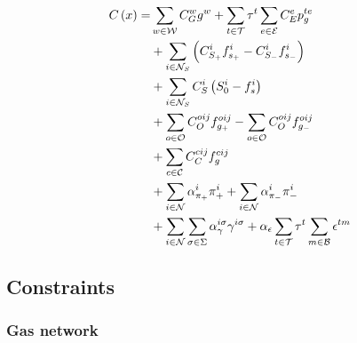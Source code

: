 
\begin{equation}
\begin{aligned}
C \left( x \right) = & \sum_{w \in \cal{W}}{C^{w}_{G} g^{w}} + \sum_{t \in \cal{T}} {\tau}^{t}  \sum_{e \in \cal{E}} {C^{e}_{E} p_{g}^{te}}\\ 
				& + \sum_{i \in {\cal{N}}_{S}}{\left({C^{i}_{S_+} f^{i}_{s_+}} - {C^{i}_{S_-} f^{i}_{s_-}}  \right)}\\
				& + \sum_{i \in {\cal{N}}_{S}}{C^{i}_{S} \left( S^{i}_{0} - f^{i}_{s} \right)} \\
				& + \sum_{o \in \cal{O}}{C^{oij}_{O} f^{oij}_{g_+}} - \sum_{o \in \cal{O}}{C^{oij}_{O} f^{oij}_{g_-}} \\
				& + \sum_{c \in \cal{C}}{C^{cij}_{C} f^{cij}_{g}} \\ 
				& + \sum_{i \in \cal{N}}{\alpha^{i}_{\pi_+} \pi^{i}_{+}} + \sum_{i \in \cal{N}}{ \alpha^{i}_{\pi_-} \pi^{i}_{-}} \\
				& + \sum_{i \in \cal{N}}\sum_{\sigma \in \Sigma} {\alpha_{\gamma}^{i \sigma}\gamma^{i \sigma}} + \alpha_{\epsilon} \sum_{t \in \cal{T}} {\tau}^{t} \sum_{m \in \cal{B}} {\epsilon^{tm}}  
\end{aligned}
\label{obj_func}
\end{equation}

\subsection{Constraints}

\subsubsection{Gas network}

